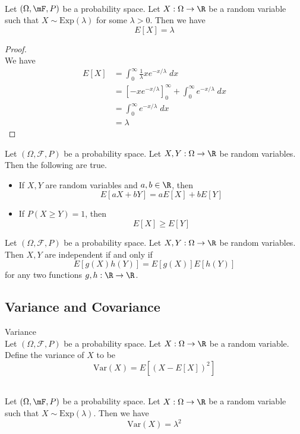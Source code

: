 \documentclass[a4paper]{article}
\begin{document}
\begin{eg}{}{}\\
Let $(\Omega,\mF,P)$ be a probability space. Let $X:\Omega\to\R$ be a random variable such that $X\sim\text{Exp}(\lambda)$ for some $\lambda>0$. Then we have $$E[X]=\lambda$$
\begin{proof}\\
We have
\begin{align*}
E[X]&=\int_0^\infty\frac{1}{\lambda}xe^{-x/\lambda}\;dx\\
&=[-xe^{-x/\lambda}]_0^\infty+\int_0^\infty e^{-x/\lambda}\;dx\\
&=\int_0^\infty e^{-x/\lambda}\;dx\\
&=\lambda
\end{align*}
\end{proof}
\end{eg}

\begin{prp}{}{} Let $(\Omega,\mathcal{F},P)$ be a probability space. Let $X,Y:\Omega\to\R$ be random variables. Then the following are true. 
\begin{itemize}
\item If $X,Y$ are random variables and $a,b\in\R$, then $$E[aX+bY]=aE[X]+bE[Y]$$
\item If $P(X\geq Y)=1$, then $$E[X]\geq E[Y]$$
\end{itemize}
\end{prp}

\begin{prp}{}{} Let $(\Omega,\mathcal{F},P)$ be a probability space. Let $X,Y:\Omega\to\R$ be random variables. Then $X,Y$ are independent if and only if $$E[g(X)h(Y)]=E[g(X)]E[h(Y)]$$ for any two functions $g,h:\R\to\R$. 
\end{prp}

\subsection{Variance and Covariance}
\begin{defn}{Variance}{}\\
Let $(\Omega,\mathcal{F},P)$ be a probability space. Let $X:\Omega\to\R$ be a random variable. Define the variance of $X$ to be $$\text{Var}(X)=E[(X-E[X])^2]$$
\end{defn}

\begin{eg}{}{}\\
Let $(\Omega,\mF,P)$ be a probability space. Let $X:\Omega\to\R$ be a random variable such that $X\sim\text{Exp}(\lambda)$. Then we have $$\text{Var}(X)=\lambda^2$$
\end{eg}
\end{document}
